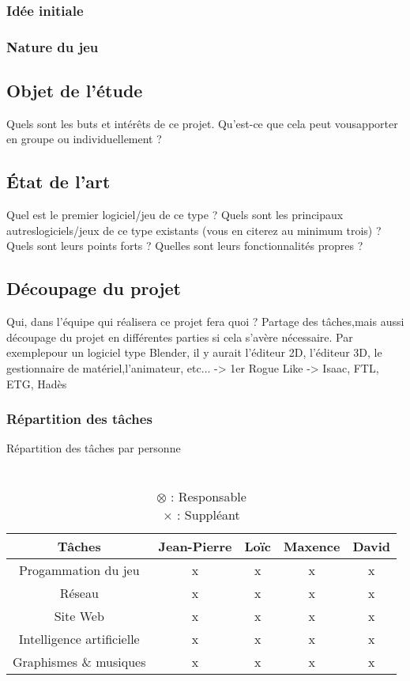 \documentclass{article}
\begin{document}
\subsubsection{Idée initiale}
\subsubsection{Nature du jeu}

\subsection{Objet de l'étude}
Quels sont les buts et intérêts de ce projet. Qu’est-ce que cela peut vousapporter en groupe ou individuellement ?

\subsection{État de l'art}
Quel est le premier logiciel/jeu de ce type ? Quels sont les principaux autreslogiciels/jeux de ce type existants (vous en citerez au minimum trois) ? Quels sont leurs points forts ? Quelles sont leurs fonctionnalités propres ?

\subsection{Découpage du projet}
Qui, dans l’équipe qui réalisera ce projet fera quoi ? Partage des tâches,mais aussi découpage du projet en différentes parties si cela s’avère nécessaire. Par exemplepour un logiciel type Blender, il y aurait l’éditeur 2D, l’éditeur 3D, le gestionnaire de matériel,l’animateur, etc... \newline
-> 1er Rogue Like \newline
-> Isaac, FTL, ETG, Hadès

\pagebreak
\subsubsection{Répartition des tâches}

\begin{table}
    \centering
    \caption*{Répartition des tâches par personne}
    \begin{tabular}{ |c|c|c|c|c| } %
        \hline
        Tâches & Jean-Pierre & Loïc & Maxence & David \\
        \hline
        Progammation du jeu & x & x & x & x \\
        \hline
        Réseau & x & x & x & x \\
        \hline
        Site Web & x & x & x & x \\
        \hline
        Intelligence artificielle & x & x & x & x \\
        \hline
        Graphismes \& musiques & x & x & x & x \\
        \hline
    \end{tabular}
    \caption*{
        \\ $\otimes$ : Responsable
        \\ $\times$ : Suppléant
    }
    \label{table:repartition}
\end{table}
\end{document}

